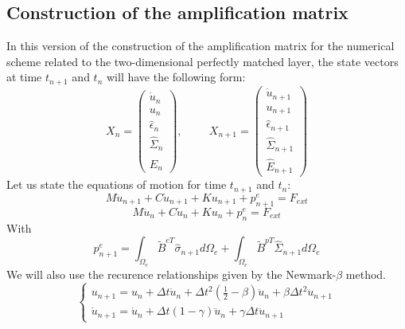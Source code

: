 \subsection{Construction of the amplification matrix}
In this version of the construction of the amplification matrix for the numerical scheme related to the two-dimensional perfectly matched layer, the state vectors at time $t_{n+1}$ and $t_n$ will have the following form:
\begin{equation}
X_n = \begin{pmatrix}
\dot{u}_n \\
u_n \\
\hat{\epsilon}_{n} \\
\hat{\Sigma}_{n} \\
\hat{E}_{n} 
\end{pmatrix}, \hspace{1cm}
X_{n+1}= \begin{pmatrix}
\dot{u}_{n+1} \\
u_{n+1} \\
\hat{\epsilon}_{n+1} \\
\hat{\Sigma}_{n+1} \\
\hat{E}_{n+1} 
\end{pmatrix}
\end{equation}   
Let us state the equations of motion for time $t_{n+1}$ and $t_n$:
\begin{equation}
M \ddot{u}_{n+1} +C \dot{u}_{n+1} 
+K u_{n+1} + p^e_{n+1} = F_{ext}
\label{eq:motion-pmlv2-tn+1}
\end{equation}
\begin{equation}
M \ddot{u}_{n} +C \dot{u}_{n} 
+K u_{n} + p^e_{n} = F_{ext}
\label{eq:motion-pmlv2-tn}
\end{equation}
With 
\begin{equation}
p^e_{n+1} = \int_{\Omega_{e}} \tilde{B}^{eT}  \hat{\sigma}_{n+1} d\Omega_{e} + \int_{\Omega_{e}} \tilde{B}^{pT}  \hat{\Sigma}_{n+1} d\Omega_{e}
\label{eq:v2-internal-forces}
\end{equation}
We will also use the recurence relationships given by the Newmark-$\beta$ method.
\begin{equation}
	\begin{cases}
		u_{n+1} = u_n + \Delta t \dot{u}_n + \Delta t^2 \left(\frac{1}{2}-\beta\right)\ddot{u}_n + \beta \Delta t^2 \ddot{u}_{n+1} \\
		\dot{u}_{n+1} = \dot{u}_n + \Delta t (1-\gamma) \ddot{u}_n + \gamma \Delta t \ddot{u}_{n+1}
	\end{cases}
	\label{eq:Newmark-relationsV2}
\end{equation}
